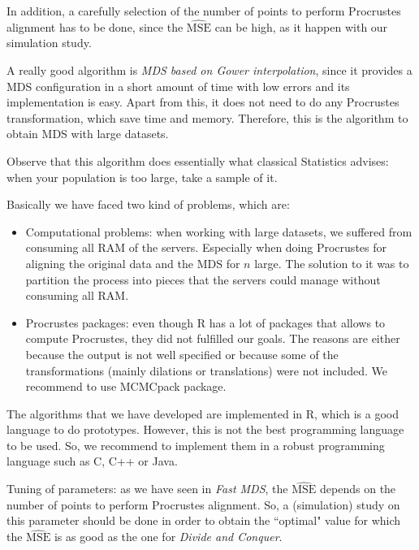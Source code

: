 \documentclass[11pt]{report}
\begin{document}
\indent In addition, a carefully selection of the number of points to perform 
Procrustes alignment has to be done, since the $\widehat{\mbox{MSE}}$
can be high, as it happen with our simulation study.

\indent A really good algorithm is \textit{MDS based on Gower interpolation},
since it provides a MDS configuration in a short amount of time with low errors 
and its implementation is easy. Apart from this, it does not need to do 
any Procrustes transformation, which save time and memory. Therefore, this 
is the algorithm to obtain MDS with large datasets.

\indent Observe that this algorithm does essentially what classical Statistics 
advises: when your population is too large, take a sample of it. \\


\indent Basically we have faced two kind of problems, which are:

\begin{itemize}
\item Computational problems: when working with large datasets, we suffered from
consuming all RAM of the servers. Especially when doing Procrustes for aligning
the original data and the MDS for $n$ large. The solution to it was to partition
the process into pieces that the servers could manage without consuming all RAM.

\item Procrustes packages: even though \textsf{R} has a lot of packages that
allows to compute Procrustes, they did not fulfilled our goals. The reasons are
either because the output is not well specified or because some of the 
transformations (mainly dilations or translations) were not included. We 
recommend to use \textsf{MCMCpack} package.

\end{itemize}


\indent The algorithms that we have developed are implemented in \textsf{R},
which is a good language to do prototypes. However, this is not the best
programming language to be used. So, we recommend to implement them in a robust 
programming language such as \textsf{C}, \textsf{C++} or \textsf{Java}.

\indent Tuning of parameters: as we have seen in \textit{Fast MDS}, the 
$\widehat{\mbox{MSE}}$ depends on the number of points to perform Procrustes
alignment. So, a (simulation) study on this parameter should be done in order 
to obtain the ``optimal" value for which the $\widehat{\mbox{MSE}}$ is as good
as the one for \textit{Divide and Conquer}.
\end{document}
